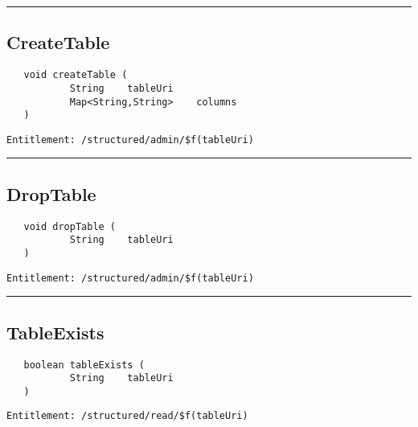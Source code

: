 \rule{12cm}{2pt}
\subsection{CreateTable}
\label{Api:CreateTable}
\begin{verbatim}
   void createTable (
           String    tableUri
           Map<String,String>    columns
   )
\end{verbatim}
\begin{Verbatim}[fontsize=\small, formatcom=\color{Maroon}]
  Entitlement: /structured/admin/$f(tableUri)
\end{Verbatim}



\rule{12cm}{2pt}
\subsection{DropTable}
\label{Api:DropTable}
\begin{verbatim}
   void dropTable (
           String    tableUri
   )
\end{verbatim}
\begin{Verbatim}[fontsize=\small, formatcom=\color{Maroon}]
  Entitlement: /structured/admin/$f(tableUri)
\end{Verbatim}



\rule{12cm}{2pt}
\subsection{TableExists}
\label{Api:TableExists}
\begin{verbatim}
   boolean tableExists (
           String    tableUri
   )
\end{verbatim}
\begin{Verbatim}[fontsize=\small, formatcom=\color{Maroon}]
  Entitlement: /structured/read/$f(tableUri)
\end{Verbatim}



